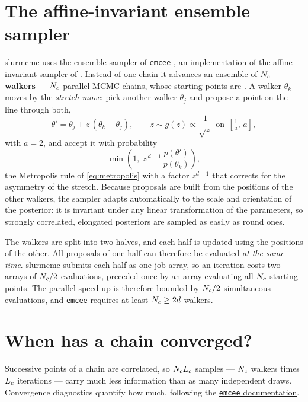 \section{The affine-invariant ensemble sampler}

slurmcmc uses the ensemble sampler of \texttt{emcee} \citep{foreman2013}, an implementation of
the affine-invariant sampler of \citet{goodman2010}. Instead of one chain it advances an ensemble
of $N_c$ \textbf{walkers} --- $N_c$ parallel MCMC chains, whose starting points are
. A walker $\theta_k$ moves by the \emph{stretch move}: pick another walker
$\theta_j$ and propose a point on the line through both,
\begin{equation}
  \theta' = \theta_j + z\,(\theta_k - \theta_j),
  \qquad z \sim g(z) \propto \frac{1}{\sqrt{z}}\ \ \text{on}\ \ \left[\tfrac{1}{a},\, a\right],
\end{equation}
with $a = 2$, and accept it with probability
\begin{equation}
  \min\!\left(1,\; z^{\,d-1}\,\frac{p(\theta')}{p(\theta_k)}\right),
\end{equation}
the Metropolis rule of \cref{eq:metropolis} with a factor $z^{d-1}$ that corrects for the
asymmetry of the stretch.
Because proposals are built from the positions of the other walkers, the sampler adapts
automatically to the scale and orientation of the posterior: it is invariant under any linear
transformation of the parameters, so strongly correlated, elongated posteriors are sampled as
easily as round ones.

\begin{keypoint}
The walkers are split into two halves, and each half is updated using the positions of the other.
All proposals of one half can therefore be evaluated \emph{at the same time}. slurmcmc submits each
half as one job array, so an iteration costs two arrays of $N_c/2$ evaluations, preceded once by an
array evaluating all $N_c$ starting points. The parallel speed-up is therefore bounded by $N_c/2$
simultaneous evaluations, and \texttt{emcee} requires at least $N_c \ge 2d$ walkers.
\end{keypoint}

\section{When has a chain converged?}
\label{sec:mcmc-convergence}

Successive points of a chain are correlated, so $N_c L_c$ samples --- $N_c$ walkers times $L_c$
iterations --- carry much less information than as many independent draws. Convergence diagnostics
quantify how much, following the \href{https://emcee.readthedocs.io/en/stable/tutorials/autocorr/}{\texttt{emcee}
documentation}.

